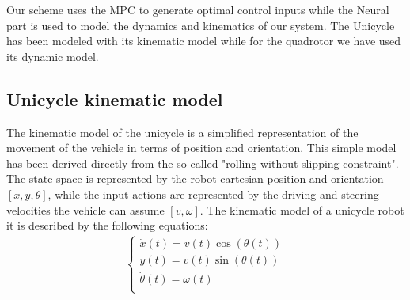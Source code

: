 Our scheme uses the MPC to generate optimal control inputs while the Neural part is used to model the dynamics and kinematics of our system.
The Unicycle has been modeled with its kinematic model while for the quadrotor we have used its dynamic model.
\subsection{Unicycle kinematic model}
The kinematic model of the unicycle is a simplified representation of the movement of the vehicle
in terms of position and orientation. This simple model has been derived directly from the so-called "rolling without slipping constraint". 
The state space is represented by the robot cartesian position and orientation $[x, y, \theta]$, while the input actions are represented by the driving and steering velocities the vehicle can assume $[v, \omega]$.
The kinematic model of a unicycle robot it is described by the following equations:
\begin{align}
    \label{eq:unicycle}
    \begin{cases}
        \dot{x}(t) = v(t) \cos(\theta(t)) \\
        \dot{y}(t) = v(t) \sin(\theta(t)) \\
        \dot{\theta}(t) = \omega(t) \\
    \end{cases}
\end{align} 
